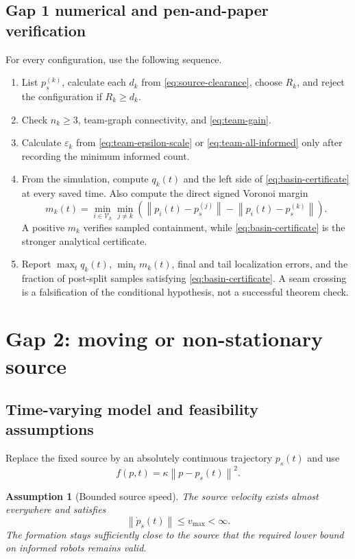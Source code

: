 \documentclass[11pt]{article}
\newtheorem{assumption}{Assumption}
\newcommand{\V}{\mathcal{V}}
\newcommand{\norm}[1]{\left\lVert #1\right\rVert}
\newcommand{\NotationContext}[1]{\markboth{#1}{#1}}
\begin{document}
\subsection{Gap 1 numerical and pen-and-paper verification}\label{sec:gap1-validation}
\NotationContext{teams}

For every configuration, use the following sequence.
\begin{enumerate}
    \item List $p_s^{(k)}$, calculate each $d_k$ from \eqref{eq:source-clearance}, choose $R_k$, and reject the configuration if $R_k\geq d_k$.
    \item Check $n_k\geq3$, team-graph connectivity, and \eqref{eq:team-gain}.
    \item Calculate $\varepsilon_k$ from \eqref{eq:team-epsilon-scale} or \eqref{eq:team-all-informed} only after recording the minimum informed count.
    \item From the simulation, compute $q_k(t)$ and the left side of \eqref{eq:basin-certificate} at every saved time. Also compute the direct signed Voronoi margin
    \begin{equation}\label{eq:direct-basin-margin}
        m_k(t)=\min_{i\in\V_k}\min_{j\ne k}
        \left(\norm{p_i(t)-p_s^{(j)}}-\norm{p_i(t)-p_s^{(k)}}\right).
    \end{equation}
    A positive $m_k$ verifies sampled containment, while \eqref{eq:basin-certificate} is the stronger analytical certificate.
    \item Report $\max_tq_k(t)$, $\min_tm_k(t)$, final and tail localization errors, and the fraction of post-split samples satisfying \eqref{eq:basin-certificate}. A seam crossing is a falsification of the conditional hypothesis, not a successful theorem check.
\end{enumerate}

\section{Gap 2: moving or non-stationary source}\label{sec:gap2}
\NotationContext{moving}

\subsection{Time-varying model and feasibility assumptions}

Replace the fixed source by an absolutely continuous trajectory $p_s(t)$ and use
\begin{equation}\label{eq:moving-field}
    f(p,t)=\kappa\norm{p-p_s(t)}^2.
\end{equation}
\begin{assumption}[Bounded source speed]\label{ass:source-speed}
The source velocity exists almost everywhere and satisfies
\begin{equation}\label{eq:source-speed}
    \norm{\dot p_s(t)}\leq v_{\max}<\infty.
\end{equation}
The formation stays sufficiently close to the source that the required lower bound on informed robots remains valid.
\end{assumption}
\end{document}
